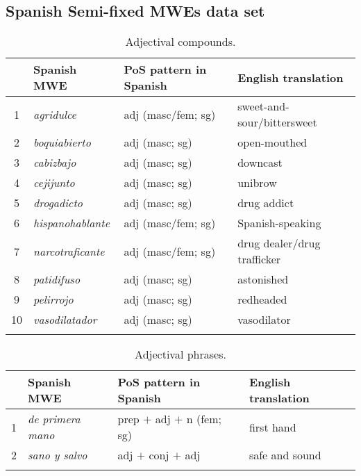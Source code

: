\documentclass[output=paper]{langsci/langscibook}
\begin{document}
\clearpage
\subsection{Spanish Semi-fixed MWEs data set}
\label{sec:appendixB_semifixedMWEs}

\begin{table}

\caption{Adjectival compounds.}
\label{tab:adjCompounds-semifixed}
\begin{tabular}{clll}
\lsptoprule
 &{\textbf{Spanish MWE}} &{\textbf{PoS pattern in Spanish}} &{\textbf{English translation}} \\ %
\midrule
1 & \textit{agridulce} & adj (masc/fem; sg) & sweet-and-sour/bittersweet \\
2 & \textit{boquiabierto} & adj (masc; sg) & open-mouthed \\
3 & \textit{cabizbajo} & adj (masc; sg) & downcast \\
4 & \textit{cejijunto} & adj (masc; sg) & unibrow \\
5 & \textit{drogadicto} & adj (masc; sg) & drug addict \\
6 & \textit{hispanohablante} & adj (masc/fem; sg) & Spanish-speaking \\
7 & \textit{narcotraficante} & adj (masc/fem; sg) & drug dealer/drug trafficker \\
8 & \textit{patidifuso} & adj (masc; sg) & astonished \\
9 & \textit{pelirrojo} & adj (masc; sg) & redheaded \\
10 & \textit{vasodilatador} & adj (masc; sg) & vasodilator\\
\lspbottomrule
\end{tabular}
\end{table}

\begin{table}

\caption{Adjectival phrases.}
\label{tab:adjPhrases-semifixed}
\begin{tabularx}{\textwidth}{lXll}
\lsptoprule
 &{\textbf{Spanish MWE}} &{\textbf{PoS pattern in Spanish}} &{\textbf{English translation}} \\%
\midrule
1 & \textit{de primera mano} & prep $+$ adj $+$ n  (fem; sg) & first hand \\
2 & \textit{sano y salvo} & adj $+$ conj $+$ adj & safe and sound\\
\lspbottomrule
\end{tabularx}
\end{table}
\end{document}
